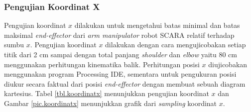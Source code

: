 \subsubsection{Pengujian Koordinat X}
 Pengujian koordinat $x$ dilakukan untuk mengetahui batas minimal dan batas maksimal \textit{end-effector} dari \textit{arm manipulator} robot SCARA relatif terhadap sumbu $x$. Pengujian koordinat $x$ dilakukan dengan cara mengujicobakan setiap titik dari 2 cm sampai dengan total panjang \textit{shoulder} dan \textit{elbow} yaitu 80 cm menggunakan perhitungan kinematika balik. Perhitungan posisi $x$ diujicobakan menggunakan program Processing IDE, sementara untuk pengukuran posisi diukur secara faktual dari posisi \textit{end-effector} dengan membuat sebuah diagram kartesius. Tabel \ref{tbl.koordinatx} menunjukkan pengujian koordinat $x$ dan Gambar \ref{pic.koordinatx} menunjukkan grafik dari \textit{sampling} koordinat $x$.
